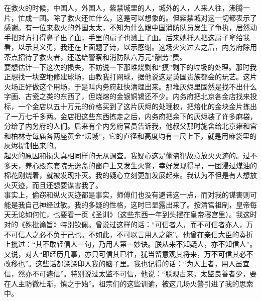 在救火的时候，中国人，外国人，紫禁城里的人，城外的人，人来人往，沸腾一片，忙成一团。除了救火还忙什么，这是可以想象的。但紫禁城对这一切都表示了感谢。有一位来救火的外国太太，不知为什么跟中国消防队员发生了争执，居然动手把对方打得鼻子出了血，手里的扇子也溅上了血。后来她托人把这扇子拿给我看，以示其义勇，我还在上面题了诗，以示感谢。这场火灾过去之后，内务府除用茶点招待了救火者，还送给警察和消防队六万元“酬劳”费。\\

要想估计一下这次的损失，不妨说一下那堆烧剩和“摸”剩下的垃圾的处理。那时我正想找一块空地修建球场，由教我打网球，据他说这是英国贵族都会的玩艺。这片火场正好做这个用场，于是叫内务府赶快清理出来。那堆灰烬里固然是找不出什么字画、古瓷之类的东西了，但烧熔的金银铜锡还不少。内务府把北京各金店找来投标，一个金店以五十万元的价格买到了这片灰烬的处理权，把熔化的金块金片拣出了一万七千多两。金店把这些东西拣走之后，内务府把余下的灰烬装了许多麻袋，分给了内务府的人们。后来有个内务府官员告诉我，他叔父那时施舍给北京雍和宫和柏林寺每庙各两座黄金“坛城”，它的直径和高度均有一尺上下，就是用麻袋里的灰烬提制出来的。\\

起火的原因和损失真相同样的无从调查。我疑心这是偷盗犯故意放火灭迹的。过不多天，养心殿东套院无逸斋的窗户上又发生火警，幸好发现得早，一团浸过煤油的棉花刚烧着，就被发现扑灭。我的疑心立刻更加发展起来。我认为不但是有人想放火灭迹，而且还想要谋害我了。\\

事实上，偷窃和纵火灭迹都是事实，师傅们也没有避讳这一点，而对我的谋害则可能是我自己神经过敏。我的多疑的性格，这时已显露出来了。按清宫祖制，皇帝每天无论如何忙，也要看一页《圣训》（这些东西一年到头摆在皇帝寝宫里）。我这时对的《殊批谕旨》特别钦佩。曾说过这样的话：“可信者人，而不可信者亦人，万不可信人之必不负于己也。不如此，不可以言用人之能”。他曾在亲信大臣的奏折上批过：“其不敢轻信人一句，乃用人第一妙诀。朕从来不知疑人，亦不知信人”。又说，对人“即经历几事，亦只可信其已往，犹当留意观其将来，万不可信其必不改移也”。这些话都深深印人我的脑子里。我也记得的话：“为人上者，用人虽宜信，然亦不可遽信”。特别说过太监不可信，他说：“朕观古来，太监良善者少，要在人主防微杜渐，慎之于始”。祖宗们的这些训谕，被这几场火警引进了我的思索中。\\

